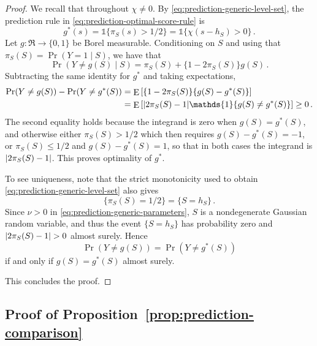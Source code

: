 \documentclass{article}
\makeatletter
\DeclareMathOperator{\expect}{E}
\theoremstyle{definition}
\newcommand{\abs}[1]{%
	\ensuremath{%
		\if@display
		\left| #1 \right|
		\else
		\lvert #1 \rvert
		\fi
	}%
}
\makeatother
\begin{document}
\begin{bibunit}
\begin{proof}
We recall that throughout $\chi\neq0$. By \eqref{eq:prediction-generic-level-set}, the prediction rule in
\eqref{eq:prediction-optimal-score-rule} is
$$
    g^*(s)
    =
    \mathds{1}\{\pi_S(s)>1/2\}
    =
    \mathds{1}\{\chi(s-h_S)>0\}\,.
$$
Let $g:\Re\to\{0,1\}$ be Borel measurable. Conditioning on $S$ and using that 
$\pi_S(S)=\Pr(Y=1\mid S)$, we have that 
$$
    \Pr(Y\neq g(S)\mid S)
    =
    \pi_S(S)+\{1-2\pi_S(S)\}g(S)\,.
$$
Subtracting the same identity for $g^*$ and taking expectations,
$$
\begin{aligned}
    \Pr(Y\neq g(S))
    -
    \Pr(Y\neq g^*(S))
    &=
    \expect\left[
        \{1-2\pi_S(S)\}\{g(S)-g^*(S)\}
    \right]
    \\
    &=
    \expect\left[
        \abs{2\pi_S(S)-1}
        \mathds{1}\{g(S)\neq g^*(S)\}
    \right]
    \geq
    0\,.
\end{aligned}
$$
The second equality holds because the integrand is zero when
$g(S)=g^*(S)$, and otherwise either $\pi_S(S)>1/2$ which then requires
$g(S)-g^*(S)=-1$, or $\pi_S(S)\leq1/2$ and $g(S)-g^*(S)=1$, so that in both
cases the integrand is $\abs{2\pi_S(S)-1}$. This proves optimality of $g^*$. 

To see uniqueness, note that 
the strict monotonicity used to obtain
\eqref{eq:prediction-generic-level-set} also gives
$$
    \{\pi_S(S)=1/2\}
    =
    \{S=h_S\}\,.
$$
Since $\nu>0$ in \eqref{eq:prediction-generic-parameters}, $S$ is a
nondegenerate Gaussian random variable, and thus the event $\{S=h_S\}$  has
probability zero and $\abs{2\pi_S(S)-1}>0$ almost surely. Hence
$$
    \Pr(Y\neq g(S))
    =
    \Pr(Y\neq g^*(S))
$$
if and only if $g(S)=g^*(S)$ almost surely.

This concludes the proof. 
\end{proof}

\subsection{Proof of Proposition~\ref{prop:prediction-comparison}}


\end{bibunit}
\end{document}
